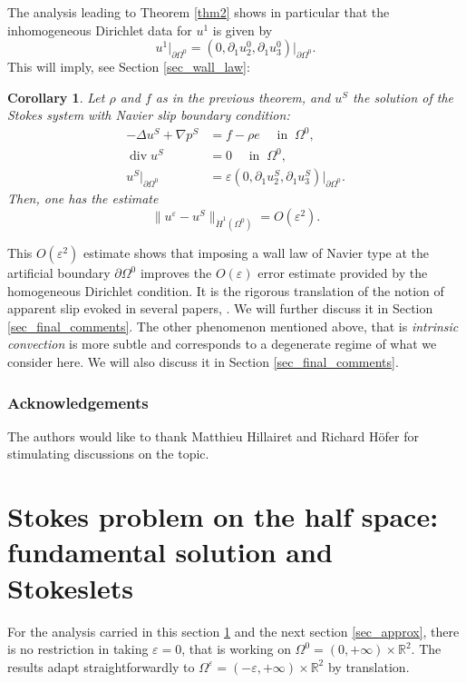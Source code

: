 \documentclass[JEP,XML,SOM,Unicode,NoEqCountersInSection,published]{cedram}
\let\epsilon\varepsilon
\renewcommand{\div}{\operatorname{div}}
\theoremstyle{plain}
\newtheorem{coro}[thm]{Corollary}
\theoremstyle{definition}
\let\pa\partial
\let\na\nabla
\let\eps\varepsilon
\newcommand{\R}{\mathbb{R}}
\begin{document}
The analysis leading to Theorem \ref{thm2} shows in particular that the inhomogeneous Dirichlet data for $u^1$ is given by
\begin{equation} \label{corrector_equation}
u^1 \vert_{\pa \Omega^0} = (0, \pa_1 u^0_{2},\pa_1 u^0_{3})\vert_{\pa \Omega^0}.
\end{equation}
This will imply, see Section \ref{sec_wall_law}:
\begin{coro} \label{coro1}
Let $\rho$ and $f$ as in the previous theorem, and $u^S$ the solution of the Stokes system with Navier slip boundary condition:
\begin{equation} \label{improved_approximation}
\begin{aligned}
-\Delta u^S + \na p^S & = f - \rho e \quad \text{ in } \: \Omega^0, \\
\div u^S & = 0 \quad \text{ in } \: \Omega^0, \\
u^S\vert_{\pa \Omega^0} & = \eps (0, \pa_1 u^S_2, \pa_1 u^S_3)\vert_{\pa \Omega^0}.
\end{aligned}
\end{equation}
Then, one has the estimate
\[
\|u^\eps-u^S\|_{\dot{H}^1(\Omega^0)} = O(\eps^2).
\]
\end{coro}
This $O(\eps^2)$ estimate shows that imposing a wall law of Navier type at the artificial boundary
$\pa \Omega^0$ improves the $O(\eps)$ error estimate provided by the homogeneous Dirichlet condition. It is the rigorous translation of the notion of apparent slip evoked in several papers, \cite{Abbasi,Koponen, Ghosh}. We will further discuss it in Section \ref{sec_final_comments}. The other phenomenon mentioned above, that is {\em intrinsic convection} is more subtle and corresponds to a degenerate regime of what we consider here. We will also discuss it in Section \ref{sec_final_comments}.

\subsubsection*{Acknowledgements}
The authors would like to thank Matthieu Hillairet and Richard Höfer for stimulating discussions on the topic.

\section{Stokes problem on the half space: fundamental solution and Stokeslets} \label{sec_stokes}
For the analysis carried in this section \ref{sec_stokes} and the next section \ref{sec_approx}, there is no restriction in taking $\eps = 0$, that is working on $\Omega^0 =(0,+\infty)\times \R^2$. The results adapt straightforwardly to $\Omega^\epsilon=(-\varepsilon,+\infty)\times \R^2$ by translation.
\end{document}
